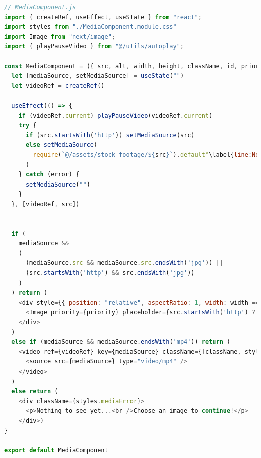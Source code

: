 \documentclass[a4paper, 12pt]{article}
\begin{document}
\begin{lstlisting}[caption=MediaComponent in Next.js, label={lst:Next:MediaComponent}, language=JavaScript, escapechar=°]
// MediaComponent.js
import { createRef, useEffect, useState } from "react";
import styles from "./MediaComponent.module.css"
import Image from "next/image";
import { playPauseVideo } from "@/utils/autoplay";

const MediaComponent = ({ src, alt, width, height, className, id, priority = false }) => {
  let [mediaSource, setMediaSource] = useState("")
  let videoRef = createRef()

  useEffect(() => {
    if (videoRef.current) playPauseVideo(videoRef.current)
    try {
      if (src.startsWith('http')) setMediaSource(src)
      else setMediaSource(
        require(`@/assets/stock-footage/${src}`).default°\label{line:Next:MediaComponent:imageImport}°
      )
    } catch (error) {
      setMediaSource("")
    }
  }, [videoRef, src])


  if (
    mediaSource &&
    (
      (mediaSource.src && mediaSource.src.endsWith('jpg')) ||
      (src.startsWith('http') && src.endsWith('jpg'))
    )
  ) return (
    <div style={{ position: "relative", aspectRatio: 1, width: width == "100%" ? width : `${width}px`, overflow: "hidden" }} id={id} className={[className, styles.postMedia].join(" ")}>
      <Image priority={priority} placeholder={src.startsWith('http') ? "empty" : "blur"} quality={50} src={mediaSource} alt={alt} width={width.endsWith("%") ? 600 : width} height={height || (width.endsWith("%") ? 600 : width)} />
    </div>
  )
  else if (mediaSource && mediaSource.endsWith('mp4')) return (
    <video ref={videoRef} key={mediaSource} className={[className, styles.postMedia].join(" ")} id={id} width={width} preload="metadata" controls controlsList="nodownload,nofullscreen,noremoteplayback" disablePictureInPicture loop muted >
      <source src={mediaSource} type="video/mp4" />
    </video>
  )
  else return (
    <div className={styles.mediaError}>
      <p>Nothing to see yet...<br />Choose an image to continue!</p>
    </div>)
}

export default MediaComponent
\end{lstlisting}

\end{document}
